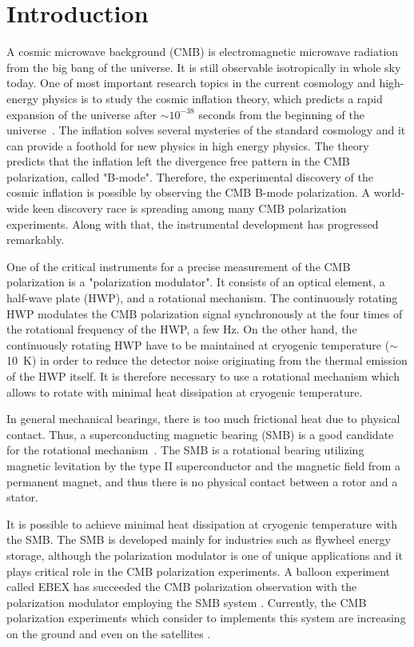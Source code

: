 \documentclass[a4paper]{jpconf}
\begin{document}
\section*{Introduction}

A cosmic microwave background (CMB) is electromagnetic microwave radiation from the big bang of the universe.
It is still observable isotropically in whole sky today.
One of most important research topics in the current cosmology and high-energy physics is to study the cosmic inflation theory, which predicts a rapid expansion of the universe after $\sim 10^{-38}$ seconds from the beginning of the universe~\cite{inflation_sato,inflation_guth}.
The inflation solves several mysteries of the standard cosmology and it can provide a foothold for new physics in high energy physics.
The theory predicts that the inflation left the divergence free pattern in the CMB polarization,  called "B-mode".
Therefore, the experimental discovery of the cosmic inflation is possible by observing the CMB B-mode polarization.
A world-wide keen discovery race is spreading among many CMB polarization experiments.
Along with that, the instrumental development has progressed remarkably.

One of the critical instruments for a precise measurement of the CMB polarization is a "polarization modulator".
It consists of an optical element, a half-wave plate (HWP), and a rotational mechanism.
The continuously rotating HWP modulates the CMB polarization signal synchronously at the four times of the rotational frequency of the HWP, a few Hz.
On the other hand, the continuously rotating HWP have to be maintained at cryogenic temperature ($\sim$ 10~K) in order to reduce the detector noise originating from the thermal emission of the HWP itself.
It is therefore necessary to use a rotational mechanism which allows to rotate with minimal heat dissipation at cryogenic temperature.

In general mechanical bearings, there is too much frictional heat due to physical contact.
Thus, a superconducting magnetic bearing (SMB) is a good candidate for the rotational mechanism~\cite{smb}.
The SMB is a rotational bearing utilizing magnetic levitation by the type II superconductor and the magnetic field from a permanent magnet, and thus there is no physical contact between a rotor and a stator.


It is possible to achieve minimal heat dissipation at cryogenic temperature with the SMB.
The SMB is developed mainly for industries such as flywheel energy storage,
although the polarization modulator is one of unique applications and it plays critical role in the CMB polarization experiments.
A balloon experiment called EBEX has succeeded the CMB polarization observation with the polarization modulator employing the SMB system \cite{ebex}.
Currently, the CMB polarization experiments which consider to implements this system are increasing on the ground and even on the satellites \cite{litebird}.
\end{document}
